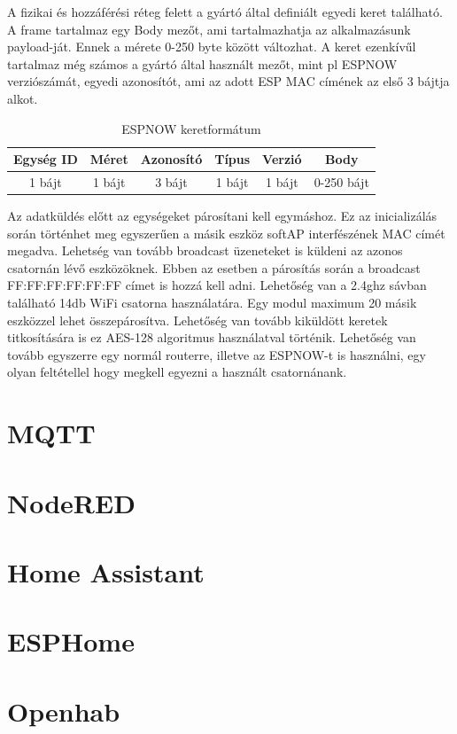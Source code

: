A fizikai és hozzáférési réteg felett a gyártó által definiált egyedi keret található. A frame tartalmaz egy Body mezőt, ami tartalmazhatja az alkalmazásunk payload-ját. Ennek a mérete 0-250 byte között változhat. A keret ezenkívűl tartalmaz még számos a gyártó által használt mezőt, mint pl ESPNOW verziószámát, egyedi azonosítót, ami az adott ESP MAC címének az első 3 bájtja alkot.

\begin{table}[ht]
	\footnotesize
	\centering
	\begin{tabular}{ | c | c | c | c | c | c |}
		\toprule
		Egység ID & Méret & Azonosító &  Típus & Verzió & Body \\
		\midrule
        1 bájt & 1 bájt & 3 bájt & 1 bájt & 1 bájt & 0-250 bájt \\
	\end{tabular}
	\caption{ESPNOW keretformátum}
	\label{tab:TabularExample}
\end{table}

Az adatküldés előtt az egységeket párosítani kell egymáshoz. Ez az inicializálás során történhet meg egyszerűen a másik eszköz softAP interfészének MAC címét megadva. Lehetség van tovább broadcast üzeneteket is küldeni az azonos csatornán lévő eszközöknek. Ebben az esetben a párosítás során a broadcast FF:FF:FF:FF:FF:FF címet is hozzá kell adni. Lehetőség van a 2.4ghz sávban található 14db WiFi csatorna használatára. Egy modul maximum 20 másik eszközzel lehet összepárosítva. Lehetőség van tovább kiküldött keretek titkosítására is ez AES-128 algoritmus használatval történik. Lehetőség van tovább egyszerre egy normál routerre, illetve az ESPNOW-t is használni, egy olyan feltétellel hogy megkell egyezni a használt csatornánank.


\section{MQTT}


\section{NodeRED}

\section{Home Assistant}

\section{ESPHome}

\section{Openhab}

